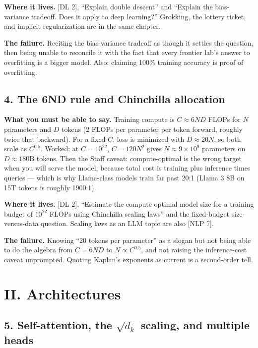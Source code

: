 \textbf{Where it lives.} [DL 2], ``Explain double descent'' and ``Explain the bias-variance tradeoff. Does it apply to deep learning?'' Grokking, the lottery ticket, and implicit regularization are in the same chapter.

\textbf{The failure.} Reciting the bias-variance tradeoff as though it settles the question, then being unable to reconcile it with the fact that every frontier lab's answer to overfitting is a bigger model. Also: claiming 100\% training accuracy is proof of overfitting.

\subsection*{4. The 6ND rule and Chinchilla allocation}

\textbf{What you must be able to say.} Training compute is $C \approx 6ND$ FLOPs for $N$ parameters and $D$ tokens (2 FLOPs per parameter per token forward, roughly twice that backward). For a fixed $C$, loss is minimized with $D \approx 20N$, so both scale as $C^{0.5}$. Worked: at $C = 10^{22}$, $C = 120 N^2$ gives $N \approx 9\times 10^{9}$ parameters on $D \approx 180$B tokens. Then the Staff caveat: compute-optimal is the wrong target when you will serve the model, because total cost is training plus inference times queries --- which is why Llama-class models train far past 20:1 (Llama 3 8B on 15T tokens is roughly 1900:1).

\textbf{Where it lives.} [DL 2], ``Estimate the compute-optimal model size for a training budget of $10^{22}$ FLOPs using Chinchilla scaling laws'' and the fixed-budget size-versus-data question. Scaling laws as an LLM topic are also [NLP 7].

\textbf{The failure.} Knowing ``20 tokens per parameter'' as a slogan but not being able to do the algebra from $C = 6ND$ to $N \propto C^{0.5}$, and not raising the inference-cost caveat unprompted. Quoting Kaplan's exponents as current is a second-order tell.

\section*{II. Architectures}

\subsection*{5. Self-attention, the $\sqrt{d_k}$ scaling, and multiple heads}

